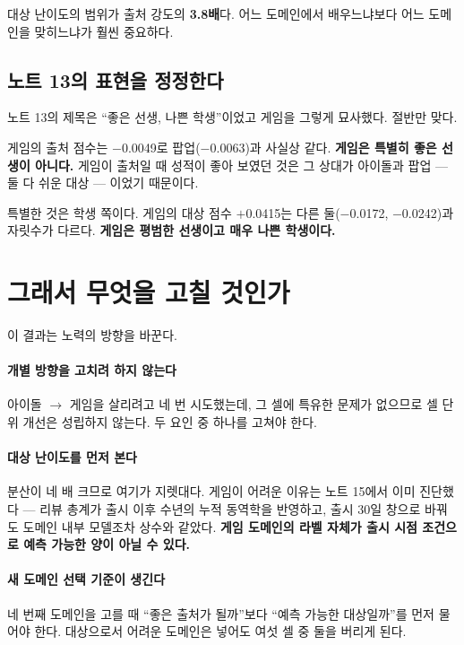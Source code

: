 \documentclass[10pt]{article}
\begin{document}
대상 난이도의 범위가 출처 강도의 \textbf{3.8배}다. 어느 도메인에서 배우느냐보다
어느 도메인을 맞히느냐가 훨씬 중요하다.


\subsection{노트 13의 표현을 정정한다}

노트 13의 제목은 ``좋은 선생, 나쁜 학생''이었고 게임을 그렇게 묘사했다. 절반만
맞다.

게임의 출처 점수는 $-$0.0049로 팝업($-$0.0063)과 사실상 같다. \textbf{게임은
특별히 좋은 선생이 아니다.} 게임이 출처일 때 성적이 좋아 보였던 것은 그 상대가
아이돌과 팝업 --- 둘 다 쉬운 대상 --- 이었기 때문이다.

특별한 것은 학생 쪽이다. 게임의 대상 점수 $+$0.0415는 다른 둘($-$0.0172,
$-$0.0242)과 자릿수가 다르다. \textbf{게임은 평범한 선생이고 매우 나쁜 학생이다.}

\section{그래서 무엇을 고칠 것인가}

이 결과는 노력의 방향을 바꾼다.

\paragraph{개별 방향을 고치려 하지 않는다}
아이돌 $\to$ 게임을 살리려고 네 번 시도했는데, 그 셀에 특유한 문제가 없으므로
셀 단위 개선은 성립하지 않는다. 두 요인 중 하나를 고쳐야 한다.

\paragraph{대상 난이도를 먼저 본다}
분산이 네 배 크므로 여기가 지렛대다. 게임이 어려운 이유는 노트 15에서 이미
진단했다 --- 리뷰 총계가 출시 이후 수년의 누적 동역학을 반영하고, 출시 30일 창으로
바꿔도 도메인 내부 모델조차 상수와 같았다. \textbf{게임 도메인의 라벨 자체가
출시 시점 조건으로 예측 가능한 양이 아닐 수 있다.}

\paragraph{새 도메인 선택 기준이 생긴다}
네 번째 도메인을 고를 때 ``좋은 출처가 될까''보다 ``예측 가능한 대상일까''를
먼저 물어야 한다. 대상으로서 어려운 도메인은 넣어도 여섯 셀 중 둘을 버리게 된다.
\end{document}
